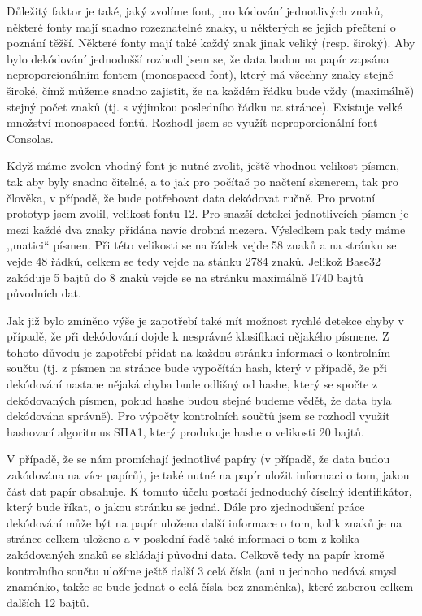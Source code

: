 \documentclass[conference]{IEEEtran}
\begin{document}

Důležitý faktor je také, jaký zvolíme font, pro kódování jednotlivých znaků, některé fonty mají snadno rozeznatelné znaky, u některých se jejich přečtení o poznání těžší. Některé fonty mají také každý znak jinak veliký (resp. široký). Aby bylo dekódování jednodušší rozhodl jsem se, že data budou na papír zapsána neproporcionálním fontem \cite{Book:TheTypographicDeskReference} (monospaced font), který má všechny znaky stejně široké, čímž můžeme snadno zajistit, že na každém řádku bude vždy (maximálně) stejný počet znaků (tj. s výjimkou posledního řádku na stránce). Existuje velké množství monospaced fontů. Rozhodl jsem se využít neproporcionální font Consolas.

Když máme zvolen vhodný font je nutné zvolit, ještě vhodnou velikost písmen, tak aby byly snadno čitelné, a to jak pro počítač po načtení skenerem, tak pro člověka, v případě, že bude potřebovat data dekódovat ručně. Pro prvotní prototyp jsem zvolil, velikost fontu 12. Pro snazší detekci jednotlivcích písmen je mezi každé dva znaky přidána navíc drobná mezera. Výsledkem pak tedy máme ,,matici`` písmen. Při této velikosti se na řádek vejde 58 znaků a na stránku se vejde 48 řádků, celkem se tedy vejde na stánku 2784 znaků. Jelikož Base32 zakóduje 5 bajtů do 8 znaků vejde se na stránku maximálně 1740 bajtů původních dat.

Jak již bylo zmíněno výše je zapotřebí také mít možnost rychlé detekce chyby v případě, že při dekódování dojde k nesprávné klasifikaci nějakého písmene. Z tohoto důvodu je zapotřebí přidat na každou stránku informaci o kontrolním součtu (tj. z písmen na stránce bude vypočítán hash, který v případě, že při dekódování nastane nějaká chyba bude odlišný od hashe, který se spočte z dekódovaných písmen, pokud hashe budou stejné budeme vědět, že data byla dekódována správně). Pro výpočty kontrolních součtů jsem se rozhodl využít hashovací algoritmus SHA1, který produkuje hashe o velikosti 20 bajtů.


V případě, že se nám promíchají jednotlivé papíry (v případě, že data budou zakódována na více papírů), je také nutné na papír uložit informaci o tom, jakou část dat papír obsahuje. K tomuto účelu postačí jednoduchý číselný identifikátor, který bude říkat, o jakou stránku se jedná. Dále pro zjednodušení práce dekódování může být na papír uložena další informace o tom, kolik znaků je na stránce celkem uloženo a v poslední řadě také informaci o tom z kolika zakódovaných znaků se skládají původní data. Celkově tedy na papír kromě kontrolního součtu uložíme ještě další 3 celá čísla (ani u jednoho nedává smysl znaménko, takže se bude jednat o celá čísla bez znaménka), které zaberou celkem dalších 12 bajtů. 
\end{document}
